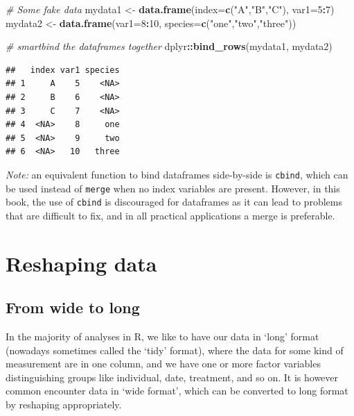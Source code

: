 \documentclass[]{book}
\newenvironment{Shaded}{\begin{snugshade}}{\end{snugshade}}
\newcommand{\CommentTok}[1]{\textcolor[rgb]{0.56,0.35,0.01}{\textit{#1}}}
\newcommand{\DataTypeTok}[1]{\textcolor[rgb]{0.13,0.29,0.53}{#1}}
\newcommand{\DecValTok}[1]{\textcolor[rgb]{0.00,0.00,0.81}{#1}}
\newcommand{\KeywordTok}[1]{\textcolor[rgb]{0.13,0.29,0.53}{\textbf{#1}}}
\newcommand{\NormalTok}[1]{#1}
\newcommand{\OperatorTok}[1]{\textcolor[rgb]{0.81,0.36,0.00}{\textbf{#1}}}
\newcommand{\StringTok}[1]{\textcolor[rgb]{0.31,0.60,0.02}{#1}}
\begin{document}
\begin{Shaded}
\begin{Highlighting}[]
\CommentTok{# Some fake data}
\NormalTok{mydata1 <-}\StringTok{ }\KeywordTok{data.frame}\NormalTok{(}\DataTypeTok{index=}\KeywordTok{c}\NormalTok{(}\StringTok{"A"}\NormalTok{,}\StringTok{"B"}\NormalTok{,}\StringTok{"C"}\NormalTok{), }\DataTypeTok{var1=}\DecValTok{5}\OperatorTok{:}\DecValTok{7}\NormalTok{) }
\NormalTok{mydata2 <-}\StringTok{ }\KeywordTok{data.frame}\NormalTok{(}\DataTypeTok{var1=}\DecValTok{8}\OperatorTok{:}\DecValTok{10}\NormalTok{, }\DataTypeTok{species=}\KeywordTok{c}\NormalTok{(}\StringTok{"one"}\NormalTok{,}\StringTok{"two"}\NormalTok{,}\StringTok{"three"}\NormalTok{)) }

\CommentTok{# smartbind the dataframes together}
\NormalTok{dplyr}\OperatorTok{::}\KeywordTok{bind_rows}\NormalTok{(mydata1, mydata2)}
\end{Highlighting}
\end{Shaded}

\begin{verbatim}
##   index var1 species
## 1     A    5    <NA>
## 2     B    6    <NA>
## 3     C    7    <NA>
## 4  <NA>    8     one
## 5  <NA>    9     two
## 6  <NA>   10   three
\end{verbatim}

\emph{Note:} an equivalent function to bind dataframes side-by-side is \texttt{cbind}, which can be used instead of \texttt{merge} when no index variables are present. However, in this book, the use of \texttt{cbind} is discouraged for dataframes as it can lead to problems that are difficult to fix, and in all practical applications a merge is preferable.

\hypertarget{reshaping}{%
\section{Reshaping data}\label{reshaping}}

\hypertarget{from-wide-to-long}{%
\subsection{From wide to long}\label{from-wide-to-long}}

In the majority of analyses in R, we like to have our data in `long' format (nowadays sometimes called the `tidy' format), where the data for some kind of measurement are in one column, and we have one or more factor variables distinguishing groups like individual, date, treatment, and so on. It is however common encounter data in `wide format', which can be converted to long format by reshaping appropriately.
\end{document}
